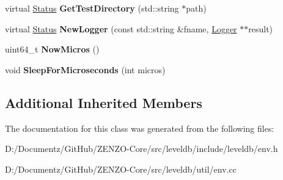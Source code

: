 \begin{DoxyCompactItemize}
\item 
\mbox{\label{classleveldb_1_1_env_wrapper_a62fdf74a9991e4226091bfdc58e97f16}} 
virtual \mbox{\hyperlink{classleveldb_1_1_status}{Status}} {\bfseries Get\+Test\+Directory} (std\+::string $\ast$path)
\item 
\mbox{\label{classleveldb_1_1_env_wrapper_af065b31ff6876780896be1c8f197e556}} 
virtual \mbox{\hyperlink{classleveldb_1_1_status}{Status}} {\bfseries New\+Logger} (const std\+::string \&fname, \mbox{\hyperlink{classleveldb_1_1_logger}{Logger}} $\ast$$\ast$result)
\item 
\mbox{\label{classleveldb_1_1_env_wrapper_ad3a36da82ba4ca10a34b45f3b9edfeaf}} 
uint64\+\_\+t {\bfseries Now\+Micros} ()
\item 
\mbox{\label{classleveldb_1_1_env_wrapper_a6e05455e32edd8cd4657fc22f4e422e9}} 
void {\bfseries Sleep\+For\+Microseconds} (int micros)
\end{DoxyCompactItemize}
\subsection*{Additional Inherited Members}


The documentation for this class was generated from the following files\+:\begin{DoxyCompactItemize}
\item 
D\+:/\+Documentz/\+Git\+Hub/\+Z\+E\+N\+Z\+O-\/\+Core/src/leveldb/include/leveldb/env.\+h\item 
D\+:/\+Documentz/\+Git\+Hub/\+Z\+E\+N\+Z\+O-\/\+Core/src/leveldb/util/env.\+cc\end{DoxyCompactItemize}
